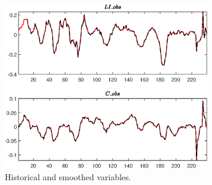  
\begin{figure}[H]
\centering 
\includegraphics[width=0.80\textwidth]{two_sector_RBC_differentiated_est/graphs/two_sector_RBC_differentiated_est_HistoricalAndSmoothedVariables1}
\caption{Historical and smoothed variables.}\label{Fig:HistoricalAndSmoothedVariables:1}
\end{figure}



